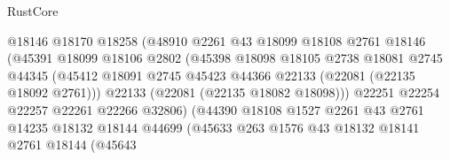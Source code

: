\begin{lexlean}{RustCore}
\begin{coremodule}
                                    @18146
                                    @18170
                                    @18258
                                    (@48910
                                      @2261
                                      @43
                                      @18099
                                      @18108
                                      @2761
                                      @18146
                                      (@45391
                                        @18099
                                        @18106
                                        @2802
                                        (@45398
                                          @18098
                                          @18105
                                          @2738
                                          @18081
                                          @2745
                                          @44345
                                          (@45412
                                            @18091
                                            @2745
                                            @45423
                                            @44366
                                            @22133
                                            (@22081 (@22135 @18092 @2761)))
                                          @22133
                                          (@22081 (@22135 @18082 @18098)))
                                        @22251
                                        @22254
                                        @22257
                                        @22261
                                        @22266
                                        @32806)
                                      (@44390
                                        @18108
                                        @1527
                                        @2261
                                        @43
                                        @2761
                                        @14235
                                        @18132
                                        @18144
                                        @44699
                                        (@45633
                                          @263
                                          @1576
                                          @43
                                          @18132
                                          @18141
                                          @2761
                                          @18144
                                          (@45643

\end{coremodule}
\end{lexlean}
